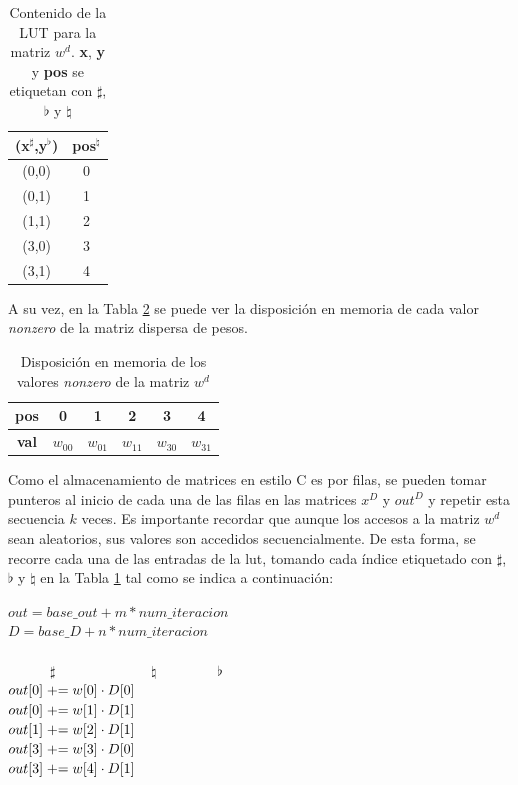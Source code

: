 \begin{table}[h!]
    \centering
    \begin{tabular}{|c|c|}
    \hline
    \textbf{(x$^{\sharp}$,y$^{\flat}$)} & \textbf{pos$^{\natural}$} \\\hline
    (0,0) & 0 \\\hline
    (0,1) & 1 \\\hline
    (1,1) & 2 \\\hline
    (3,0) & 3 \\\hline
    (3,1) & 4 \\\hline
    \end{tabular}
    \caption{Contenido de la LUT para la matriz $w^{d}$. \textbf{x}, \textbf{y} y \textbf{pos} se etiquetan con $\sharp$, {\large$\flat$} y $\natural$}
    \label{tab:lut_example}
\end{table}

A su vez, en la Tabla \ref{tab:w_matrix_memory_layout} se puede ver la disposición en memoria de cada valor \textit{nonzero} de la matriz dispersa de pesos.

\begin{table}[h!]
    \centering
    \begin{tabular}{|c|c|c|c|c|c|}
        \hline
        \textbf{pos} & 0 & 1 & 2 & 3 & 4 \\\hline
        \textbf{val} & $w_{00}$ & $w_{01}$ & $w_{11}$ & $w_{30}$ & $w_{31}$ \\\hline
    \end{tabular}
    \caption{Disposición en memoria de los valores \textit{nonzero} de la matriz $w^{d}$}
    \label{tab:w_matrix_memory_layout}
\end{table}

Como el almacenamiento de matrices en estilo C es por filas, se pueden tomar punteros al inicio de cada una de las filas en las matrices $x^{D}$ y $out^{D}$ y repetir esta secuencia $k$ veces. Es importante recordar que aunque los accesos a la matriz $w^{d}$ sean aleatorios, sus valores son accedidos secuencialmente. De esta forma, se recorre cada una de las entradas de la \acrshort{lut}, tomando cada índice etiquetado con $\sharp$, $\flat$ y $\natural$ en la Tabla \ref{tab:lut_example} tal como se indica a continuación:

\begin{center}
    $out = base\_out + m*num\_iteracion$\\
    $D = base\_D + n*num\_iteracion$\\
    \ \\
    \ \ \ \ \ \  $\sharp$ \ \ \ \ \ \ \ \ \ \ \ \ \  $\natural$ \ \ \ \ \ \ \ \  {\large$\flat$} \ \\
    $out[0] \mathrel{+}= w[0] \cdot D[0]$\\
    $out[0] \mathrel{+}= w[1] \cdot D[1]$\\
    $out[1] \mathrel{+}= w[2] \cdot D[1]$\\
    $out[3] \mathrel{+}= w[3] \cdot D[0]$\\
    $out[3] \mathrel{+}= w[4] \cdot D[1]$\\
\end{center}

